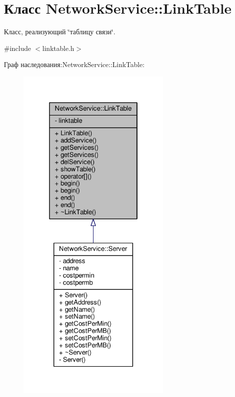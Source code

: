 \hypertarget{class_network_service_1_1_link_table}{}\section{Класс Network\+Service\+:\+:Link\+Table}
\label{class_network_service_1_1_link_table}


Класс, реализующий \char`\"{}таблицу связи\char`\"{}.  




{\ttfamily \#include $<$linktable.\+h$>$}



Граф наследования\+:Network\+Service\+:\+:Link\+Table\+:
\nopagebreak
\begin{figure}[H]
\begin{center}
\leavevmode
\includegraphics[width=214pt]{class_network_service_1_1_link_table__inherit__graph}
\end{center}
\end{figure}


